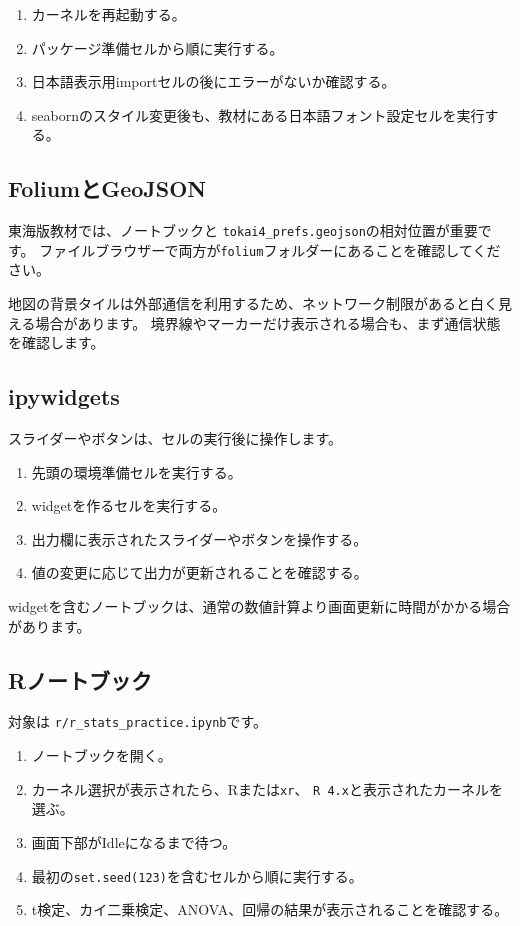 \documentclass[a4paper,11pt]{ltjsarticle}
\newcommand{\filepath}[1]{\nolinkurl{#1}}
\begin{document}
\begin{errorbox}[日本語が四角や空白になる]
\begin{enumerate}
  \item カーネルを再起動する。
  \item パッケージ準備セルから順に実行する。
  \item 日本語表示用importセルの後にエラーがないか確認する。
  \item seabornのスタイル変更後も、教材にある日本語フォント設定セルを実行する。
\end{enumerate}
\end{errorbox}

\subsection{FoliumとGeoJSON}

東海版教材では、ノートブックと
\filepath{tokai4_prefs.geojson}の相対位置が重要です。
ファイルブラウザーで両方が\filepath{folium}フォルダーにあることを確認してください。

地図の背景タイルは外部通信を利用するため、ネットワーク制限があると白く見える場合があります。
境界線やマーカーだけ表示される場合も、まず通信状態を確認します。

\subsection{ipywidgets}

スライダーやボタンは、セルの実行後に操作します。

\begin{enumerate}
  \item 先頭の環境準備セルを実行する。
  \item widgetを作るセルを実行する。
  \item 出力欄に表示されたスライダーやボタンを操作する。
  \item 値の変更に応じて出力が更新されることを確認する。
\end{enumerate}

widgetを含むノートブックは、通常の数値計算より画面更新に時間がかかる場合があります。

\subsection{Rノートブック}

対象は
\filepath{r/r_stats_practice.ipynb}です。

\begin{enumerate}
  \item ノートブックを開く。
  \item カーネル選択が表示されたら、Rまたは\texttt{xr}、
    \texttt{R 4.x}と表示されたカーネルを選ぶ。
  \item 画面下部がIdleになるまで待つ。
  \item 最初の\texttt{set.seed(123)}を含むセルから順に実行する。
  \item t検定、カイ二乗検定、ANOVA、回帰の結果が表示されることを確認する。
\end{enumerate}
\end{document}
